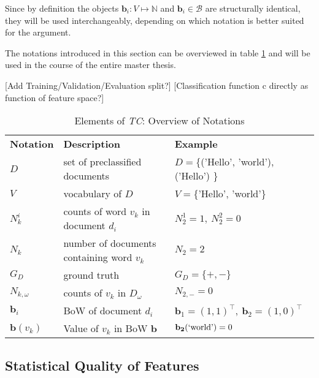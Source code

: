 Since by definition the objects $\mathbf{b}_i: V \mapsto \mathbb{N}$ and
$\mathbf{b}_i \in \mathcal{B}$ are structurally identical, they will be used interchangeably, 
depending on which notation is better suited for the argument. 

The notations introduced in this section can be overviewed in table
\ref{tab:notations} and will be used in the course of the entire 
master thesis.

[Add Training/Validation/Evaluation split?]
[Classification function c directly as function of feature space?]
\begin{table}
\begin{tabular}{|l|l|l|}

\textbf{Notation} & \textbf{Description} & \textbf{Example} \\

$D$ & set of preclassified documents & $D=$\{('Hello', 'world'),
('Hello') \} \\

$V$ & vocabulary of $D$ & $V=$\{'Hello', 'world'\} \\

$N_k^i$ & counts of word $v_k$ in document $d_i$ & $N_2^1 = 1,\ N_2^2 = 0$ 
\\

$N_k$ & number of documents containing word $v_k$ & $N_2 = 2$ \\

$G_D$ & ground truth & $G_D = \{+,-\}$  \\

$N_{k,\omega}$ & counts of $v_k$ in $D_\omega$ & $N_{2, -} = 0$ \\ 

$\mathbf{b}_i$ & BoW of document $d_i$ & $\mathbf{b}_1 = (1, 1)^\intercal,\
\mathbf{b}_2 = (1,0)^\intercal$ \\

$\mathbf{b}(v_k)$ & Value of $v_k$ in BoW $\mathbf{b}$ &
$\mathbf{b_2}(\text{\lq world\rq}) = 0$
 
\end{tabular}
\caption{Elements of \emph{TC}: Overview of Notations}
\label{tab:notations}
\end{table}
 \subsection{Statistical Quality of Features}
 
